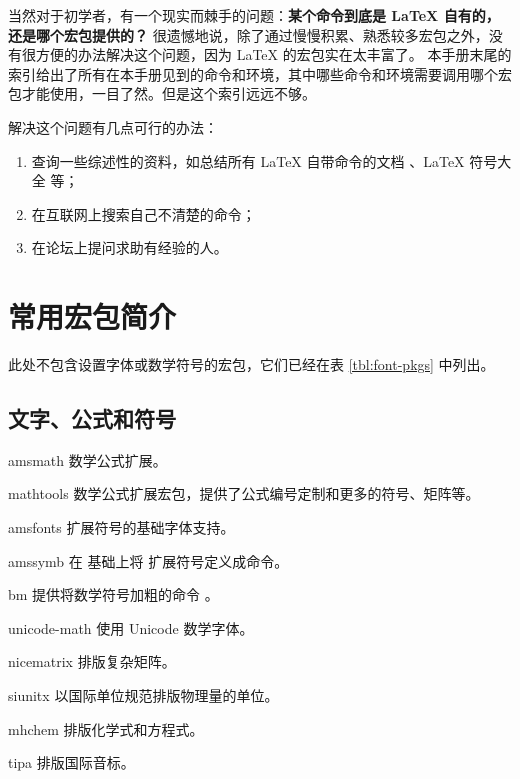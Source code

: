 当然对于初学者，有一个现实而棘手的问题：\textbf{某个命令到底是 \LaTeX{} 自有的，还是哪个宏包提供的？}
很遗憾地说，除了通过慢慢积累、熟悉较多宏包之外，没有很方便的办法解决这个问题，因为 \LaTeX{} 的宏包实在太丰富了。
本手册末尾的索引给出了所有在本手册见到的命令和环境，其中哪些命令和环境需要调用哪个宏包才能使用，一目了然。但是这个索引远远不够。

解决这个问题有几点可行的办法：
\begin{enumerate}
  \item 查询一些综述性的资料，如总结所有 \LaTeX{} 自带命令的文档 \cite{latex2e}、\LaTeX{} 符号大全 \cite{symbols} 等；
  \item 在互联网上搜索自己不清楚的命令；
  \item 在论坛上提问求助有经验的人。
\end{enumerate}

\section{常用宏包简介}\label{sec:pkg-list}

\def\pkglabel#1{\makebox[60pt][l]{\pkg{#1}}}
\newenvironment{pkglist}%
  {\list{}{%
    \labelwidth=60pt
    \itemindent=0pt
    \leftmargin=60pt
    \labelsep=0pt
    \let\makelabel\pkglabel}}%
  {\endlist}

此处不包含设置字体或数学符号的宏包，它们已经在表 \ref{tbl:font-pkgs} 中列出。

\subsection{文字、公式和符号}\label{subsec:text-math-symbols}

\begin{pkglist}
  \item[amsmath]       数学公式扩展。
  \item[mathtools]    数学公式扩展宏包，提供了公式编号定制和更多的符号、矩阵等。
  \item[amsfonts]      扩展符号的基础字体支持。
  \item[amssymb]      在  基础上将  扩展符号定义成命令。
  \item[bm]           提供将数学符号加粗的命令 。
  \item[unicode-math] 使用 Unicode 数学字体。
  \item[nicematrix]   排版复杂矩阵。
  \item[siunitx]      以国际单位规范排版物理量的单位。
  \item[mhchem]       排版化学式和方程式。
  \item[tipa]         排版国际音标。
\end{pkglist}


